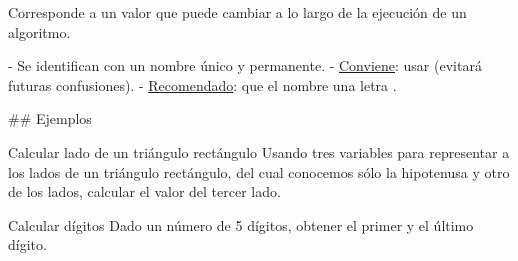 \bgnblockdefinition
{} Corresponde a un valor que puede cambiar a lo largo de la ejecución de un algoritmo.
\trmblockdefinition

\bgncolumns
{}

- Se identifican con un nombre único y permanente.
    - \underline{Conviene}: usar  (evitará futuras confusiones).
    - \underline{Recomendado}: que el nombre  una letra .

\vspace{2ex}
\small
{}
\trmcolumns

## Ejemplos

\begin{block}{Calcular lado de un triángulo rectángulo}
Usando tres variables para representar a los lados de un triángulo rectángulo, del
cual conocemos sólo la hipotenusa y otro de los lados, calcular el valor
del tercer lado.
\end{block}

\begin{block}{Calcular dígitos}
Dado un número de 5 dígitos, obtener el primer y el último dígito.
\end{block}
